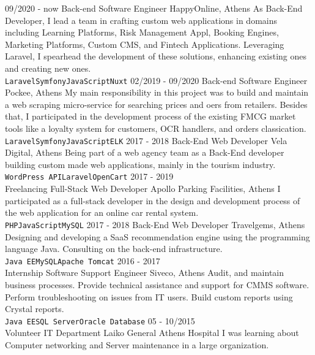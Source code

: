 \documentclass[10pt]{developercv}
\begin{document}


\begin{entrylist}
	\entry
		{09/2020 - now}
		{Back-end Software Engineer}
		{HappyOnline, Athens}
		{As Back-End Developer, I lead a team in crafting custom web applications in domains including Learning Platforms, Risk Management Appl, Booking Engines, Marketing Platforms, Custom CMS, and Fintech Applications. Leveraging Laravel, I spearhead the development of these solutions, enhancing existing ones and creating new ones. \\ \texttt{Laravel}\slashsep\texttt{Symfony}\slashsep\texttt{JavaScript}\slashsep\texttt{Nuxt}}
	\entry
		{02/2019 - 09/2020}
		{Back-end Software Engineer}
		{Pockee, Athens}
		{My main responsibility in this project was to build and maintain a web scraping micro-service for searching prices and oers from retailers. Besides that, I participated in the development process of the existing FMCG market tools like a loyalty system for customers, OCR handlers, and orders classication. \\ \texttt{Laravel}\slashsep\texttt{Symfony}\slashsep\texttt{JavaScript}\slashsep\texttt{ELK}}
	\entry
		{2017 - 2018}
		{Back-End Web Developer}
		{Vela Digital, Athens}
		{Being part of a web agency team as a Back-End developer building custom made web applications, mainly in the tourism industry.\\ \texttt{WordPress API}\slashsep\texttt{Laravel}\slashsep\texttt{OpenCart}}
	\entry
		{2017 - 2019\\\footnotesize{Freelancing}}
		{Full-Stack Web Developer}
		{Apollo Parking Facilities, Athens}
		{I participated as a full-stack developer in the design and development process of the web application for an online car rental system.\\ \texttt{PHP}\slashsep\texttt{JavaScript}\slashsep\texttt{MySQL}}
	\entry
		{2017 - 2018}
		{Back-End Web Developer}
		{Travelgems, Athens}
		{Designing and developing a SaaS recommendation engine using the programming language Java. Consulting on the back-end infrastructure.\\ \texttt{Java EE}\slashsep\texttt{MySQL}\slashsep\texttt{Apache Tomcat} }
	\entry
		{2016 - 2017\\ \footnotesize{Internship}}
		{Software Support Engineer}
		{Siveco, Athens}
		{Audit, and maintain business processes. Provide technical assistance and support for CMMS software. Perform troubleshooting on issues from IT users. Build custom reports using Crystal reports.\\ \texttt{Java EE}\slashsep\texttt{SQL Server}\slashsep\texttt{Oracle Database}}
	\entry
		{05 - 10/2015\\ \footnotesize{Volunteer}}
		{IT Department}
		{Laiko General Athens Hospital}
		{I was learning about Computer networking and Server maintenance in a large organization.}
\end{entrylist}
\end{document}
